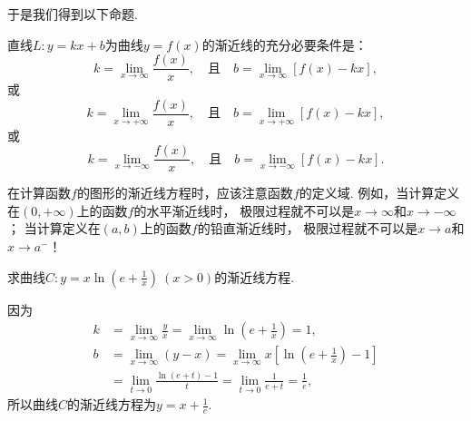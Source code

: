 于是我们得到以下命题.
\begin{proposition}
直线\(L: y = kx+b\)为曲线\(y = f(x)\)的渐近线的充分必要条件是：\[
	k = \lim_{x\to\infty} \frac{f(x)}{x},
	\quad\text{且}\quad
	b = \lim_{x\to\infty} \left[f(x) - kx\right],
\]
或\[
	k = \lim_{x\to+\infty} \frac{f(x)}{x},
	\quad\text{且}\quad
	b = \lim_{x\to+\infty} \left[f(x) - kx\right],
\]
或\[
	k = \lim_{x\to-\infty} \frac{f(x)}{x},
	\quad\text{且}\quad
	b = \lim_{x\to-\infty} \left[f(x) - kx\right].
\]
\end{proposition}

\begin{remark}
在计算函数\(f\)的图形的渐近线方程时，应该注意函数\(f\)的定义域.
例如，当计算定义在\((0,+\infty)\)上的函数\(f\)的水平渐近线时，
极限过程就不可以是\(x\to\infty\)和\(x\to-\infty\)；
当计算定义在\((a,b)\)上的函数\(f\)的铅直渐近线时，
极限过程就不可以是\(x \to a\)和\(x \to a^-\)！
\end{remark}


\begin{example}
求曲线\(C: y = x \ln(e+\frac1x)\ (x>0)\)的渐近线方程.
\begin{solution}
因为\begin{align*}
	k &= \lim_{x\to\infty} \frac{y}{x}
	= \lim_{x\to\infty} \ln(e+\frac1x)
	= 1, \\
	b &= \lim_{x\to\infty} (y-x)
	= \lim_{x\to\infty} x\left[ \ln(e+\frac1x) - 1 \right] \\
	&= \lim_{t\to0} \frac{\ln(e+t)-1}{t}
	= \lim_{t\to0} \frac1{e+t}
	= \frac1e,
\end{align*}
所以曲线\(C\)的渐近线方程为\(y = x + \frac1e\).
\end{solution}
\end{example}

